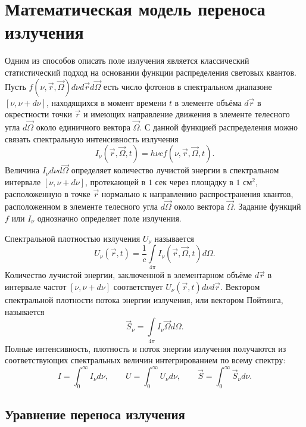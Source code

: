\chapter{Математическая модель переноса излучения}
Одним из способов описать поле излучения является классический статистический подход на основании функции распределения световых квантов. Пусть $f(\nu, \vec r, \vec \Omega) d\nu d\vec r d\vec \Omega$ есть число фотонов в спектральном диапазоне $[\nu, \nu+d\nu]$, находящихся в момент времени $t$ в элементе объёма $d\vec r$ в окрестности точки $\vec r$ и имеющих направление движения в элементе телесного угла $d\vec\Omega$ около единичного вектора $\vec \Omega$. С данной функцией распределения можно связать спектральную интенсивность излучения
\[
I_\nu(\vec r, \vec \Omega, t) = h\nu c f(\nu, \vec r, \vec \Omega, t).
\]
Величина $I_\nu d\nu d\vec \Omega$ определяет количество лучистой энергии в спектральном интервале $[\nu, \nu + d\nu]$, протекающей в $1$ сек через площадку в $1 \text{ см}^2$, расположенную в точке $\vec r$ нормально к направлению распространения квантов, расположенном в элементе телесного угла $d\vec \Omega$ около вектора $\vec \Omega$. Задание функций $f$ или $I_\nu$ однозначно определяет поле излучения.

Спектральной плотностью излучения $U_\nu$ называется
\[
U_\nu(\vec r, t) = \frac{1}{c}\int\limits_{4\pi} I_\nu(\vec r, \vec \Omega, t) d\Omega.
\]
Количество лучистой энергии, заключенной в элементарном объёме $d\vec r$ в интервале частот $[\nu, \nu + d\nu]$ соответствует $U_\nu(\vec r, t) d\nu d\vec r$. Вектором спектральной плотности потока энергии излучения, или вектором Пойтинга, называется
\[
\vec S_\nu = \int\limits_{4\pi} I_\nu \vec \Omega d\Omega.
\]
Полные интенсивность, плотность и поток энергии излучения получаются из соответствующих спектральных величин интегрированием по всему спектру:
\[
I = \int_0^\infty I_\nu d\nu, \qquad
U = \int_0^\infty U_\nu d\nu, \qquad
\vec S = \int_0^\infty \vec S_\nu d\nu.
\]

\section{Уравнение переноса излучения}

